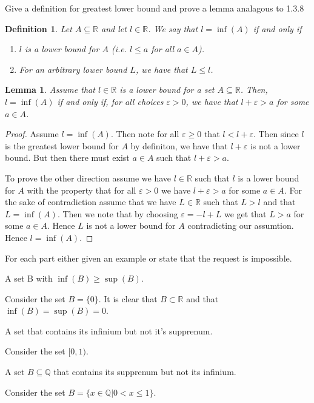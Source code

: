 \documentclass[11pt,largemargins]{homework}
\newcommand{\R}{\mathbb{R}}
\newcommand{\Q}{\mathbb{Q}}
\newcommand{\eps}{\varepsilon}
\begin{document}
\maketitle

\question
Give a definition for greatest lower bound and prove a lemma analagous to 1.3.8 

\newtheorem{definition}{Definition}
\begin{definition}
    
 Let $A \subseteq \R$ and let $l \in \R$. We say that $l = \inf(A)$ if and only if 
\begin{enumerate}
    \item $l$ is a lower bound for $A$ (i.e. $l \leq a$ for all $a \in A$).
    \item For an arbitrary lower bound $L$, we have that $L \leq l$. 
\end{enumerate}
\end{definition}
\newtheorem{lemma}{Lemma}[definition]
\begin{lemma}
    Assume that $l \in \R$ is a lower bound for a set $A \subseteq \R$. Then, $l = \inf(A)$ if and only if, for all choices $\eps > 0$, we have that 
    $l + \eps > a$ for some $a \in A$. 
\end{lemma}

\begin{proof}
    Assume $l = \inf(A)$. Then note for all $\eps \geq 0$ that $l < l + \eps$. Then since $l$ is the greatest lower bound for $A$
    by definiton, we have that $l + \eps$ is not a lower bound. But then there must exist $a \in A$ such that $l + \eps > a$. 

    To prove the other direction assume we have $l \in \R$ such that $l$ is a lower bound for $A$ with the property that 
    for all $\eps > 0$ we have $l + \eps > a$ for some $a \in A$. For the sake of contradiction assume that we have $L \in \R$ such that $L > l$ and that $L = \inf(A)$. Then we note that by choosing $\eps = -l + L$
    we get that $L > a$ for some $a \in A$. Hence $L$ is not a lower bound for $A$ contradicting our assumtion. Hence $l = \inf(A)$.  
\end{proof}

\question
For each part either given an example or state that the request is impossible. 

\begin{alphaparts}
    \questionpart
        A set B with $\inf(B) \geq \sup(B)$. 

        Consider the set $B = \{0\}$. It is clear that $B \subset \R$ and that $\inf(B) = \sup(B) = 0$. 

    \questionpart
        A set that contains its infinium but not it's supprenum. 

        Consider the set $[0, 1)$. 

    \questionpart
        A set $B \subseteq \Q$ that contains its supprenum but not its infinium. 

        Consider the set $B = \{x \in \Q | 0 < x \leq 1 \} $. 

\end{alphaparts}
\end{document}
